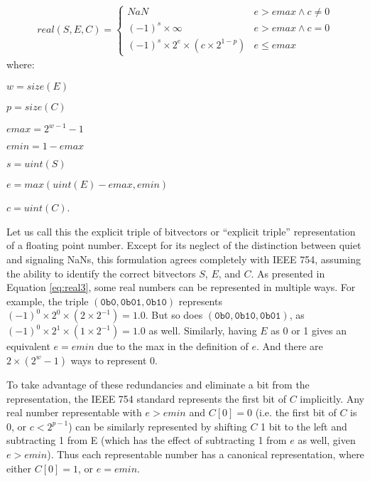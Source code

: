 \documentclass[letterpaper,10pt]{article}
\begin{document}
\begin{align} \label{eq:real3}
 real(S, E, C) =
 \begin{cases}
  NaN                                           & e > emax \land c \neq 0 \\
  (-1)^s \times \infty                          & e > emax \land c = 0    \\
  (-1)^s \times 2^e \times (c \times 2^{1 - p}) & e \leq emax
 \end{cases}
\end{align}
where:
\begin{description}
 \item $w = size(E)$
 \item $p = size(C)$
 \item $emax = 2^{w-1} - 1$
 \item $emin = 1 - emax$
 \item $s = uint(S)$
 \item $e = max(uint(E) - emax, emin)$
 \item $c = uint(C)$.
\end{description}

Let us call this the explicit triple of bitvectors or ``explicit triple'' representation of a floating point number. Except for its neglect of the distinction between quiet and signaling NaNs, this formulation agrees completely with IEEE 754, assuming the ability to identify the correct bitvectors $S$, $E$, and $C$. As presented in Equation \ref{eq:real3}, some real numbers can be represented in multiple ways. For example, the triple $(\texttt{0b0}, \texttt{0b01}, \texttt{0b10})$ represents $(-1)^0 \times 2^0 \times (2 \times 2^{-1}) = 1.0$. But so does $(\texttt{0b0}, \texttt{0b10}, \texttt{0b01})$, as $(-1)^0 \times 2^1 \times (1 \times 2^{-1}) = 1.0$ as well. Similarly, having $E$ as 0 or 1 gives an equivalent $e = emin$ due to the max in the definition of $e$. And there are $2 \times (2^w - 1)$ ways to represent 0.

To take advantage of these redundancies and eliminate a bit from the representation, the IEEE 754 standard represents the first bit of $C$ implicitly. Any real number representable with $e > emin$ and $C[0] = 0$ (i.e. the first bit of $C$ is 0, or $c < 2^{p-1}$) can be similarly represented by shifting $C$ 1 bit to the left and subtracting 1 from E (which has the effect of subtracting 1 from $e$ as well, given $e > emin$). Thus each representable number has a canonical representation, where either $C[0] = 1$, or $e = emin$. 
\end{document}
